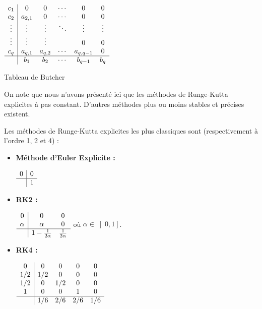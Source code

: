 \documentclass[10pt,a4paper]{amsart}
\begin{document}
\begin{table}[h!]
\begin{center}
$\begin{array}{c|ccccc}
c_1 & 0 & 0 & \cdots & 0 & 0 \\
c_2 & a_{2,1} & 0 & \cdots & 0 & 0 \\
\vdots & \vdots & \vdots & \ddots & \vdots & \vdots \\
\vdots & \vdots & \vdots &  & 0 & 0 \\
c_q & a_{q,1} & a_{q,2} & \cdots & a_{q, q-1} & 0 \\
\hline
    & b_1  & b_2 & \cdots & b_{q-1} & b_q 
\end{array}$
\caption{Tableau de Butcher}
\label{rk_butcher}
\end{center}
\end{table}

On note que nous n'avons présenté ici que les méthodes de Runge-Kutta explicites à pas constant. D'autres méthodes plus ou moins stables et précises existent.

Les méthodes de Runge-Kutta explicites les plus classiques sont (respectivement à l'ordre 1, 2 et 4) :

\begin{itemize}
\item \textbf{Méthode d'Euler Explicite :}

\begin{center}
$\begin{array}{c|c}
0 & 0 \\
\hline
  & 1 \\
\end{array}$
\end{center}

\item \textbf{RK2 : }
\begin{center}
$\begin{array}{c|cc}
0 & 0 & 0\\
\alpha & \alpha & 0 \\
\hline
  & 1-\frac{1}{2 \alpha} & \frac{1}{2 \alpha} \\
\end{array}$
\hspace{1cm} où $\alpha \in \left] 0, 1 \right]$.
\end{center}


\item \textbf{RK4 : }
\begin{center}
$\begin{array}{c|cccc}
0 & 0 & 0 & 0 & 0\\
1/2 & 1/2 & 0 & 0 & 0 \\
1/2 & 0 & 1/2 & 0 & 0 \\
1 & 0 & 0 & 1 & 0 \\
\hline
  & 1/6 & 2/6 & 2/6 & 1/6 \\
\end{array}$
\end{center}

\end{itemize}
\end{document}
